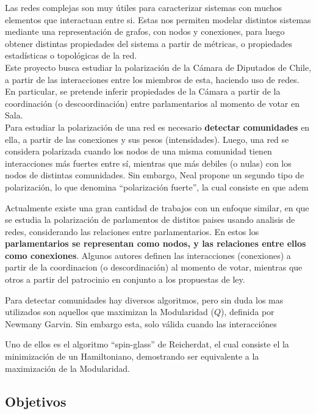 \documentclass{proyectotesis}
\begin{document}
Las redes complejas son muy útiles para caracterizar sistemas con muchos elementos que interactuan entre si. Estas nos permiten modelar distintos sistemas mediante una representación de grafos, con nodos y conexiones, para luego obtener distintas propiedades del sistema a partir de métricas, o propiedades estadísticas o topológicas de la red.\\

Este proyecto busca estudiar la polarización de la Cámara de Diputados de Chile, a partir de las interacciones entre los miembros de esta, haciendo uso de redes. En particular, se pretende inferir propiedades de la Cámara a partir de la coordinación (o descoordinación) entre parlamentarios al momento de votar en Sala. \\

Para estudiar la polarización de una red es necesario \textbf{detectar comunidades} en ella, a partir de las conexiones y sus pesos (intensidades). Luego, una red se considera polarizada cuando los nodos de una misma comunidad tienen interacciones más fuertes entre sí, mientras que más debiles (o nulas) con los nodos de distintas comunidades. Sin embargo, Neal propone un segundo tipo de polarización, lo que denomina ``polarización fuerte'', la cual consiste en que adem


Actualmente existe una gran cantidad de trabajos con un enfoque similar, en que se estudia la polarización de parlamentos de distitos paises usando analisis de redes, considerando las relaciones entre parlamentarios. En estos los \textbf{parlamentarios se representan como nodos, y las relaciones entre ellos como conexiones}. Algunos autores definen las interacciones (conexiones) a partir de la coordinacion (o descordinación) al momento de votar, mientras que otros a partir del patrocinio en conjunto a los propuestas de ley. 

Para detectar comunidades hay diversos algoritmos, pero sin duda los mas utilizados son aquellos que maximizan la Modularidad ($Q$), definida por Newmany Garvin. Sin embargo esta, solo válida cuando las interacciónes 


Uno de ellos es el algoritmo ``spin-glass'' de Reicherdat, el cual consiste el la minimización de un Hamiltoniano, demostrando ser equivalente a la maximización de la Modularidad.




\subsection{Objetivos}
\end{document}
